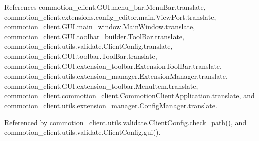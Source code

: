 References commotion\+\_\+client.\+G\+U\+I.\+menu\+\_\+bar.\+Menu\+Bar.\+translate, commotion\+\_\+client.\+extensions.\+config\+\_\+editor.\+main.\+View\+Port.\+translate, commotion\+\_\+client.\+G\+U\+I.\+main\+\_\+window.\+Main\+Window.\+translate, commotion\+\_\+client.\+G\+U\+I.\+toolbar\+\_\+builder.\+Tool\+Bar.\+translate, commotion\+\_\+client.\+utils.\+validate.\+Client\+Config.\+translate, commotion\+\_\+client.\+G\+U\+I.\+toolbar.\+Tool\+Bar.\+translate, commotion\+\_\+client.\+G\+U\+I.\+extension\+\_\+toolbar.\+Extension\+Tool\+Bar.\+translate, commotion\+\_\+client.\+utils.\+extension\+\_\+manager.\+Extension\+Manager.\+translate, commotion\+\_\+client.\+G\+U\+I.\+extension\+\_\+toolbar.\+Menu\+Item.\+translate, commotion\+\_\+client.\+commotion\+\_\+client.\+Commotion\+Client\+Application.\+translate, and commotion\+\_\+client.\+utils.\+extension\+\_\+manager.\+Config\+Manager.\+translate.



Referenced by commotion\+\_\+client.\+utils.\+validate.\+Client\+Config.\+check\+\_\+path(), and commotion\+\_\+client.\+utils.\+validate.\+Client\+Config.\+gui().


